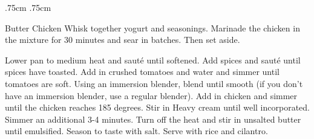 \documentclass[]{article}
\title{}
\author{}
\begin{document}
\RecipeWidths{\textwidth}{3cm}{0.5cm}{5cm} {.75cm} {.75cm}
\begin{recipe}{Butter Chicken}{}{}	
	Whisk together yogurt and seasonings. Marinade the chicken in the mixture for 30 minutes and sear in batches. Then set aside. 
	
	Lower pan to medium heat and sauté until softened. 
	Add spices and sauté until spices have toasted.
	Add in crushed tomatoes and water and simmer until tomatoes are soft. Using an immersion blender, blend until smooth (if you don't have an immersion blender, use a regular blender). Add in chicken and simmer until the chicken reaches 185 degrees.
	Stir in Heavy cream until well incorporated. Simmer an additional 3-4 minutes.
	Turn off the heat and stir in unsalted butter until emulsified. Season to taste with salt. Serve with rice and cilantro.
\end{recipe}
\end{document}
